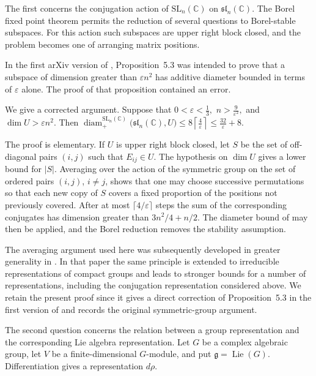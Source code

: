 \documentclass[11pt]{article}
\theoremstyle{remark}
\newcommand{\C}{\mathbb C}
\begin{document}
The first concerns the conjugation action of $\mathrm{SL}_n(\C)$ on $\mathfrak{sl}_n(\C)$. The Borel fixed point theorem permits the reduction of several questions to Borel-stable subspaces. For this action such subspaces are upper right block closed, and the problem becomes one of arranging matrix positions.

In the first arXiv version of \cite{JezernikSpenko}, Proposition~5.3 was intended to prove that a subspace of dimension greater than $\varepsilon n^2$ has additive diameter bounded in terms of $\varepsilon$ alone. The proof of that proposition contained an error.

We give a corrected argument. Suppose that $
0<\varepsilon<\frac13,$ 
$n>\frac9{\varepsilon^2},$ and $\dim U>\varepsilon n^2.$
Then $
\operatorname{diam}^{\mathrm{SL}_n(\C)}_{+}
\bigl(\mathfrak{sl}_n(\C),U\bigr)
\leq
8\left\lceil\frac4\varepsilon\right\rceil
\leq
\frac{32}{\varepsilon}+8.
$

The proof is elementary. If $U$ is upper right block closed, let $S$ be the set of off-diagonal pairs $(i,j)$ such that $E_{ij}\in U$. The hypothesis on $\dim U$ gives a lower bound for $|S|$. Averaging over the action of the symmetric group on the set of ordered pairs $(i,j)$, $i\neq j$, shows that one may choose successive permutations so that each new copy of $S$ covers a fixed proportion of the positions not previously covered. After at most $\lceil 4/\varepsilon\rceil$ steps the sum of the corresponding conjugates has dimension greater than $3n^2/4+n/2$. The diameter bound of \cite{JezernikSpenko} may then be applied, and the Borel reduction removes the stability assumption.

The averaging argument used here was subsequently developed in greater generality in \cite{JezernikSpenko2026}. In that paper the same principle is extended to irreducible representations of compact groups and leads to stronger bounds for a number of representations, including the conjugation representation considered above. We retain the present proof since it gives a direct correction of Proposition~5.3 in the first version of \cite{JezernikSpenko} and records the original symmetric-group argument.

The second question concerns the relation between a group representation and the corresponding Lie algebra representation. Let $G$ be a complex algebraic group, let $V$ be a finite-dimensional $G$-module, and put $\mathfrak g=\operatorname{Lie}(G)$. Differentiation gives a representation $
d\rho.$
\end{document}
